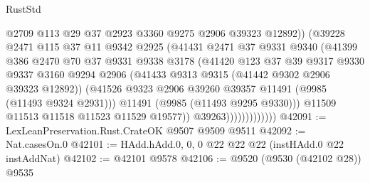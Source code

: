 \begin{lexlean}{RustStd}
\begin{coremodule}
                                @2709
                                @113
                                @29
                                @37
                                @2923
                                @3360
                                @9275
                                @2906
                                @39323
                                @12892))
                            (@39228
                              @2471
                              @115
                              @37
                              @11
                              @9342
                              @2925
                              (@41431
                                @2471
                                @37
                                @9331
                                @9340
                                (@41399
                                  @386
                                  @2470
                                  @70
                                  @37
                                  @9331
                                  @9338
                                  @3178
                                  (@41420
                                    @123
                                    @37
                                    @39
                                    @9317
                                    @9330
                                    @9337
                                    @3160
                                    @9294
                                    @2906
                                    (@41433 @9313 @9315 (@41442 @9302 @2906 @39323 @12892))
                                    (@41526
                                      @9323
                                      @2906
                                      @39260
                                      @39357
                                      @11491
                                      (@9985 (@11493 @9324 @2931)))
                                    @11491
                                    (@9985 (@11493 @9295 @9330)))
                                  @11509
                                  @11513
                                  @11518
                                  @11523
                                  @11529
                                  @19577))
                              @39263)))))))))))))
@42091 := LexLeanPreservation.Rust.CrateOK @9507 @9509 @9511
@42092 := Nat.casesOn.{0}
@42101 := HAdd.hAdd.{0, 0, 0} @22 @22 @22 (instHAdd.{0} @22 instAddNat)
@42102 := @42101 @9578
@42106 := @9520 (@9530 (@42102 @28)) @9535

\end{coremodule}
\end{lexlean}
